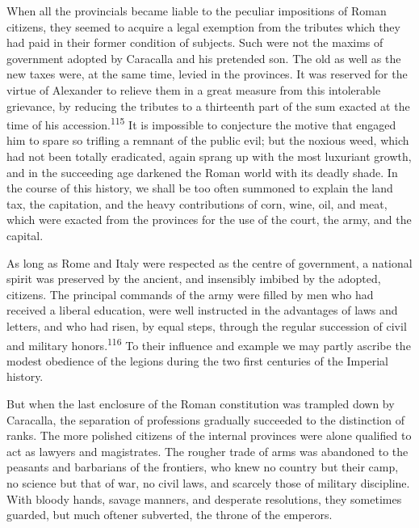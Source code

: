 When all the provincials became liable to the peculiar
impositions of Roman citizens, they seemed to acquire a legal
exemption from the tributes which they had paid in their former
condition of subjects. Such were not the maxims of government
adopted by Caracalla and his pretended son. The old as well as
the new taxes were, at the same time, levied in the provinces. It
was reserved for the virtue of Alexander to relieve them in a
great measure from this intolerable grievance, by reducing the
tributes to a thirteenth part of the sum exacted at the time of
his accession.\textsuperscript{115} It is impossible to conjecture the motive that
engaged him to spare so trifling a remnant of the public evil;
but the noxious weed, which had not been totally eradicated,
again sprang up with the most luxuriant growth, and in the
succeeding age darkened the Roman world with its deadly shade. In
the course of this history, we shall be too often summoned to
explain the land tax, the capitation, and the heavy contributions
of corn, wine, oil, and meat, which were exacted from the
provinces for the use of the court, the army, and the capital.


As long as Rome and Italy were respected as the centre of
government, a national spirit was preserved by the ancient, and
insensibly imbibed by the adopted, citizens. The principal
commands of the army were filled by men who had received a
liberal education, were well instructed in the advantages of laws
and letters, and who had risen, by equal steps, through the
regular succession of civil and military honors.\textsuperscript{116} To their
influence and example we may partly ascribe the modest obedience
of the legions during the two first centuries of the Imperial
history.


But when the last enclosure of the Roman constitution was
trampled down by Caracalla, the separation of professions
gradually succeeded to the distinction of ranks. The more
polished citizens of the internal provinces were alone qualified
to act as lawyers and magistrates. The rougher trade of arms was
abandoned to the peasants and barbarians of the frontiers, who
knew no country but their camp, no science but that of war, no
civil laws, and scarcely those of military discipline. With
bloody hands, savage manners, and desperate resolutions, they
sometimes guarded, but much oftener subverted, the throne of the
emperors.

